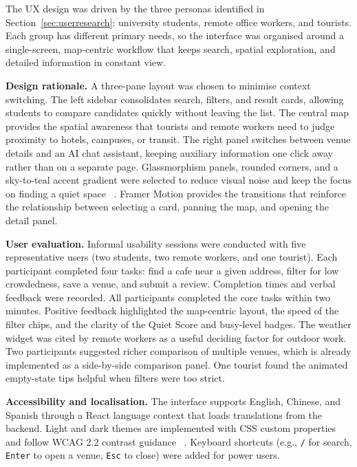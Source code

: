 \documentclass[conference]{IEEEtran}
\begin{document}
The UX design was driven by the three personas identified in Section~\ref{sec:userresearch}: university students, remote office workers, and tourists. Each group has different primary needs, so the interface was organised around a single-screen, map-centric workflow that keeps search, spatial exploration, and detailed information in constant view.

\textbf{Design rationale.} A three-pane layout was chosen to minimise context switching. The left sidebar consolidates search, filters, and result cards, allowing students to compare candidates quickly without leaving the list. The central map provides the spatial awareness that tourists and remote workers need to judge proximity to hotels, campuses, or transit. The right panel switches between venue details and an AI chat assistant, keeping auxiliary information one click away rather than on a separate page. Glassmorphism panels, rounded corners, and a sky-to-teal accent gradient were selected to reduce visual noise and keep the focus on finding a quiet space~
\cite{wcag22}. Framer Motion provides the transitions that reinforce the relationship between selecting a card, panning the map, and opening the detail panel.

\textbf{User evaluation.} Informal usability sessions were conducted with five representative users (two students, two remote workers, and one tourist). Each participant completed four tasks: find a cafe near a given address, filter for low crowdedness, save a venue, and submit a review. Completion times and verbal feedback were recorded. All participants completed the core tasks within two minutes. Positive feedback highlighted the map-centric layout, the speed of the filter chips, and the clarity of the Quiet Score and busy-level badges. The weather widget was cited by remote workers as a useful deciding factor for outdoor work. Two participants suggested richer comparison of multiple venues, which is already implemented as a side-by-side comparison panel. One tourist found the animated empty-state tips helpful when filters were too strict.

\textbf{Accessibility and localisation.} The interface supports English, Chinese, and Spanish through a React language context that loads translations from the backend. Light and dark themes are implemented with CSS custom properties and follow WCAG 2.2 contrast guidance~
\cite{wcag22}. Keyboard shortcuts (e.g., \texttt{/} for search, \texttt{Enter} to open a venue, \texttt{Esc} to close) were added for power users.
\end{document}
